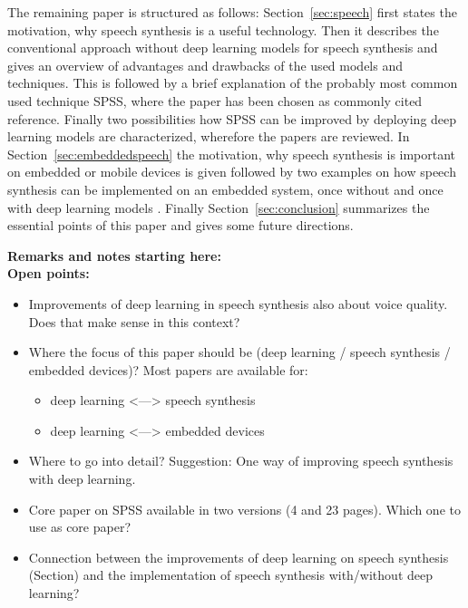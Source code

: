 The remaining paper is structured as follows: Section~\ref{sec:speech} first states the motivation, why speech synthesis is a useful technology. Then it describes the conventional approach without deep learning models for speech synthesis and gives an overview of advantages and drawbacks of the used models and techniques. This is followed by a brief explanation of the probably most common used technique \ac{SPSS}, where the paper \cite{zen:statistical} has been chosen as commonly cited reference. Finally two possibilities how \ac{SPSS} can be improved by deploying deep learning models are characterized, wherefore the papers \cite{zen:deepstatistical, hashimoto:effect} are reviewed. In Section~\ref{sec:embeddedspeech} the motivation, why speech synthesis is important on embedded or mobile devices is given followed by two examples on how speech synthesis can be implemented on an embedded system, once without \cite{toth:optimizing} and once with deep learning models \cite{boros:robust}. Finally Section~\ref{sec:conclusion} summarizes the essential points of this paper and gives some future directions.


\vspace{3em}


\textbf{\Large Remarks and notes starting here:}\\


\textbf{Open points:}

\begin{itemize}[leftmargin=10pt]
	\item Improvements of deep learning in speech synthesis also about voice quality. Does that make sense in this context?
	\item Where the focus of this paper should be (deep learning / speech synthesis / embedded devices)? Most papers are available for:
	\begin{itemize}
		\item deep learning <---> speech synthesis
		\item deep learning <---> embedded devices
	\end{itemize}
	\item Where to go into detail? Suggestion: One way of improving speech synthesis with deep learning.
	\item Core paper on \ac{SPSS} \cite{zen:statistical} available in two versions (4 and 23 pages). Which one to use as core paper?
	\item Connection between the improvements of deep learning on speech synthesis (Section) and the implementation of speech synthesis with/without deep learning?
\end{itemize}

